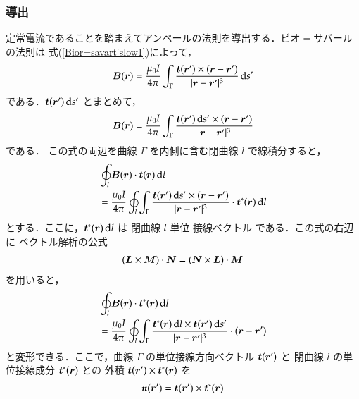        \subsubsection{導出}
            定常電流であることを踏まえてアンペールの法則を導出する．ビオ$=$サバールの法則は
            式(\ref{Bior=savart'slow1})によって，
            \begin{align}
            \boldsymbol{B}(\boldsymbol{r})
            =\frac{\mu_{0}I}{4\pi}
             \int_{\Gamma}\frac{\boldsymbol{t}(\boldsymbol{r}')\times
             (\boldsymbol{r}-\boldsymbol{r}')
            }{|\boldsymbol{r}-\boldsymbol{r}'|^{3}}\,\mathrm{d} s'
            \end{align}
            である．$\boldsymbol{t}(\boldsymbol{r}')\,\mathrm{d} s'$ とまとめて，
            \begin{align}
            \boldsymbol{B}(\boldsymbol{r})
            =\frac{\mu_{0}I}{4\pi}
             \int_{\Gamma}\frac{\boldsymbol{t}(\boldsymbol{r}')\,\mathrm{d} s'\times
             (\boldsymbol{r}-\boldsymbol{r}')
            }{|\boldsymbol{r}-\boldsymbol{r}'|^{3}}
            \end{align}
            である．
            この式の両辺を曲線 $\Gamma$ を内側に含む閉曲線 $l$ で線積分すると，
            \begin{align}
            &\oint_{l}\boldsymbol{B}(\boldsymbol{r})\cdot \boldsymbol{t}(\boldsymbol{r}) \,\mathrm{d} l \notag \\
            &=\frac{\mu_{0}I}{4\pi}\oint_{l}
             \int_{\Gamma}\frac{\boldsymbol{t}(\boldsymbol{r}')\,\mathrm{d} s'\times
             (\boldsymbol{r}-\boldsymbol{r}')
            }{|\boldsymbol{r}-\boldsymbol{r}'|^{3}}\cdot \boldsymbol{t}^{\ast}(\boldsymbol{r})
            \,\mathrm{d} l
            \end{align}
            とする．ここに，$\boldsymbol{t}^{\ast}(\boldsymbol{r})\,\mathrm{d} l$ は 閉曲線 $l$  単位
            接線ベクトル である．この式の右辺に ベクトル解析の公式
            \begin{align*}
            (\boldsymbol{L}\times\boldsymbol{M})\cdot\boldsymbol{N}
            =(\boldsymbol{N}\times\boldsymbol{L})\cdot\boldsymbol{M}
            \end{align*}
            を用いると，
            \begin{align}
            &\oint_{l}\boldsymbol{B}(\boldsymbol{r})\cdot \boldsymbol{t}^{\ast}(\boldsymbol{r}) \,\mathrm{d} l \notag \\
            &=\frac{\mu_{0}I}{4\pi}\oint_{l}
             \int_{\Gamma}\frac{\boldsymbol{t}^{\ast}(\boldsymbol{r})\,\mathrm{d} l\times\boldsymbol{t}(\boldsymbol{r}')\,\mathrm{d} s'
            }{|\boldsymbol{r}-\boldsymbol{r}'|^{3}}\cdot
            (\boldsymbol{r}-\boldsymbol{r}')
            \end{align}
            と変形できる．ここで，曲線 $\Gamma$ の単位接線方向ベクトル $\boldsymbol{t}(\boldsymbol{r}')$ と
            閉曲線 $l$ の単位接線成分 $\boldsymbol{t}^{\ast}(\boldsymbol{r})$ との
            外積 $\boldsymbol{t}(\boldsymbol{r}')\times\boldsymbol{t}^{\ast}(\boldsymbol{r})$ を
            \begin{align*}
            \textit{\textbf{n}}(\boldsymbol{r}')=\boldsymbol{t}(\boldsymbol{r}')\times\boldsymbol{t}^{\ast}(\boldsymbol{r})
            \end{align*}
